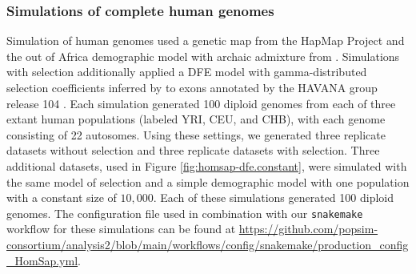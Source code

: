 \documentclass[hidelinks]{article}
\newcommand{\stdpopsim}{\texttt{stdpopsim}\xspace}
\newcommand{\snakemake}{\texttt{snakemake}\xspace}
\begin{document}
    \subsubsection*{Simulations of complete human genomes}
    Simulation of human genomes used a genetic map from the HapMap Project
    \citep[\stdpopsim label \texttt{HapMapII\_GRCh38}]{international2007second} and
    the out of Africa demographic model with archaic admixture from
    \citet[\stdpopsim label \texttt{OutOfAfricaArchaicAdmixture\_5R19}]{ragsdale2019models}.
    Simulations with selection additionally applied a DFE model with gamma-distributed selection coefficients inferred by
    \citet[\stdpopsim label \texttt{Gamma\_K17}]{kim2017inference} to exons annotated by the HAVANA group release 104
    \citep[\stdpopsim label \texttt{ensembl\_havana\_104\_exons}]{ensembl2018}.
    Each simulation generated 100 diploid genomes from each of three extant human populations (labeled YRI, CEU, and CHB),
    with each genome consisting of 22 autosomes.
    Using these settings, we generated three replicate datasets without selection
    and three replicate datasets with selection.
    Three additional datasets, used in Figure \ref{fig:homsap-dfe.constant},
    were simulated with the same model of selection and a simple demographic model with one population with a constant size of $10,000$.
    Each of these simulations generated 100 diploid genomes.
    The configuration file used in combination with our \snakemake workflow
    for these simulations can be found at \url{https://github.com/popsim-consortium/analysis2/blob/main/workflows/config/snakemake/production_config_HomSap.yml}.
\end{document}
